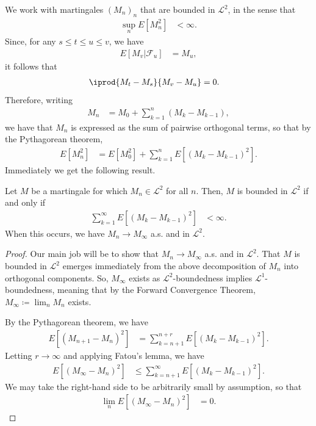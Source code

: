 \documentclass[10pt]{mypackage}
\renewcommand{\coloneq}{\coloneqq}
\begin{document}
We work with martingales $\left( M_n \right)_n$ that are bounded in $\mathcal{L}^2$, in the sense that
\begin{align*}
  \sup_{n} E\left[ M_n^2 \right] &< \infty.
\end{align*}
Since, for any $s\leq t \leq u \leq v$, we have
\begin{align*}
  E\left[ M_v|\mathcal{F}_u \right] &= M_u,
\end{align*}
it follows that
\begin{align*}
  \iprod{M_t-M_s}{M_v-M_u} &= 0.
\end{align*}
Therefore, writing
\begin{align*}
  M_n &= M_0 + \sum_{k=1}^{n} \left( M_{k}-M_{k-1} \right),
\end{align*}
we have that $M_n$ is expressed as the sum of pairwise orthogonal terms, so that by the Pythagorean theorem,
\begin{align*}
  E\left[ M_n^2 \right] &= E\left[ M_0^2 \right] + \sum_{k=1}^{n} E\left[ \left( M_k-M_{k-1} \right)^2 \right].
\end{align*}
Immediately we get the following result.
\begin{theorem}
  Let $M$ be a martingale for which $M_n\in \mathcal{L}^2$ for all $n$. Then, $M$ is bounded in $\mathcal{L}^2$ if and only if
  \begin{align*}
    \sum_{k=1}^{\infty} E\left[ \left( M_{k}-M_{k-1} \right)^2 \right] &< \infty.
  \end{align*}
  When this occurs, we have $M_n\to M_{\infty}$ a.s. and in $\mathcal{L}^2$.
\end{theorem}
\begin{proof}
  Our main job will be to show that $M_n\to M_{\infty}$ a.s. and in $\mathcal{L}^2$. That $M$ is bounded in $\mathcal{L}^2$ emerges immediately from the above decomposition of $M_n$ into orthogonal components. So, $M_{\infty}$ exists as $\mathcal{L}^2$-boundedness implies $\mathcal{L}^1$-boundedness, meaning that by the Forward Convergence Theorem, $M_{\infty}\coloneq \lim_{n}M_n$ exists.

  By the Pythagorean theorem, we have
  \begin{align*}
    E\left[ \left( M_{n+1}-M_{n} \right)^2 \right] &= \sum_{k=n+1}^{n+r}E\left[ \left( M_k-M_{k-1} \right)^2 \right].
  \end{align*}
  Letting $r\to\infty$ and applying Fatou's lemma, we have
  \begin{align*}
    E\left[ \left( M_{\infty}-M_n \right)^2 \right] &\leq \sum_{k= n+1}^{\infty}E\left[ \left( M_k-M_{k-1} \right)^2 \right].
  \end{align*}
  We may take the right-hand side to be arbitrarily small by assumption, so that
  \begin{align*}
    \lim_{n} E\left[ \left( M_{\infty}-M_n \right)^2 \right]&=0.
  \end{align*}
\end{proof}
\end{document}
